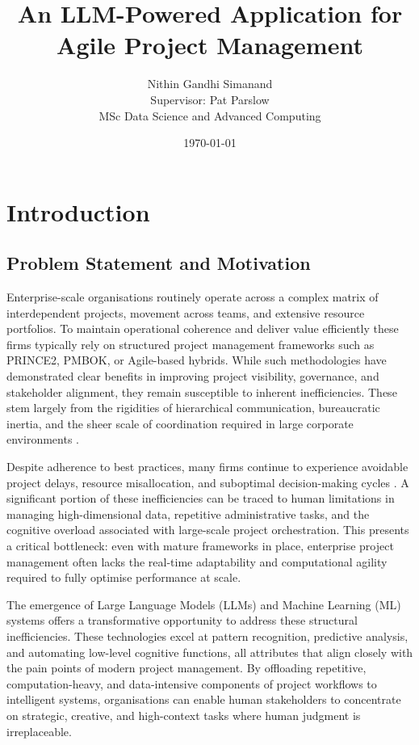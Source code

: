 \documentclass{report}
\title{\textbf{An LLM-Powered Application for Agile Project Management}}
\author{Nithin Gandhi Simanand \\ Supervisor: Pat Parslow \\ MSc Data Science and Advanced Computing}
\date{\today}
\begin{document}
\maketitle

\tableofcontents

\newpage

\chapter{Introduction}  %
\section{Problem Statement and Motivation}

Enterprise-scale organisations routinely operate across a complex matrix of interdependent projects, movement across teams, and extensive resource portfolios. To maintain operational coherence and deliver value efficiently these firms typically rely on structured project management frameworks such as PRINCE2, PMBOK, or Agile-based hybrids. While such methodologies have demonstrated clear benefits in improving project visibility, governance, and stakeholder alignment, they remain susceptible to inherent inefficiencies. These stem largely from the rigidities of hierarchical communication, bureaucratic inertia, and the sheer scale of coordination required in large corporate environments \parencite{pricaEnhancingProjectEfficiency2025}.

Despite adherence to best practices, many firms continue to experience avoidable project delays, resource misallocation, and suboptimal decision-making cycles \parencite{mankinsTurningGreatStrategy2005}. A significant portion of these inefficiencies can be traced to human limitations in managing high-dimensional data, repetitive administrative tasks, and the cognitive overload associated with large-scale project orchestration. This presents a critical bottleneck: even with mature frameworks in place, enterprise project management often lacks the real-time adaptability and computational agility required to fully optimise performance at scale.

The emergence of Large Language Models (LLMs) and Machine Learning (ML) systems offers a transformative opportunity to address these structural inefficiencies. These technologies excel at pattern recognition, predictive analysis, and automating low-level cognitive functions, all attributes that align closely with the pain points of modern project management. By offloading repetitive, computation-heavy, and data-intensive components of project workflows to intelligent systems, organisations can enable human stakeholders to concentrate on strategic, creative, and high-context tasks where human judgment is irreplaceable.
\end{document}
